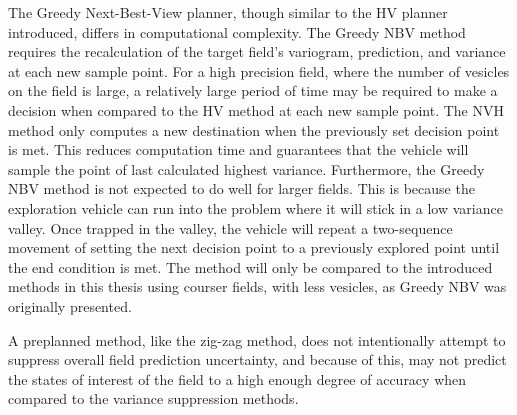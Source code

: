 The Greedy Next-Best-View planner, though similar to the HV planner introduced, differs in computational complexity. The Greedy NBV method requires the recalculation of the target field's variogram, prediction, and variance at each new sample point. For a high precision field, where the number of vesicles on the field is large, a relatively large period of time may be required to make a decision when compared to the HV method at each new sample point. The NVH method only computes a new destination when the previously set decision point is met. This reduces computation time and guarantees that the vehicle will sample the point of last calculated highest variance. Furthermore, the Greedy NBV method is not expected to do well for larger fields. This is because the exploration vehicle can run into the problem where it will stick in a low variance valley. Once trapped in the valley, the vehicle will repeat a two-sequence movement of setting the next decision point to a previously explored point until the end condition is met. The method will only be compared to the introduced methods in this thesis using courser fields, with less vesicles, as Greedy NBV was originally presented.

A preplanned method, like the zig-zag method, does not intentionally attempt to suppress overall field prediction uncertainty, and because of this, may not predict the states of interest of the field to a high enough degree of accuracy when compared to the variance suppression methods.